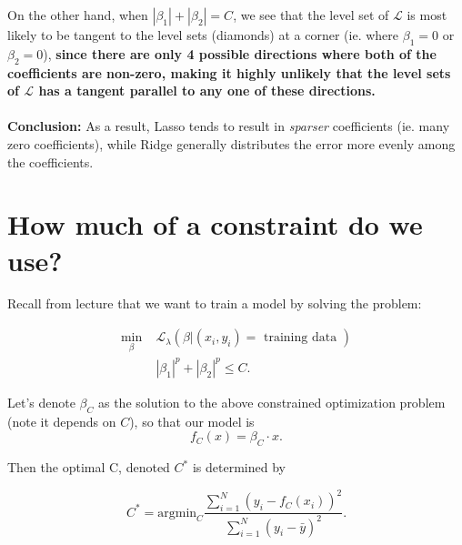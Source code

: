 \documentclass[paper=a4, fontsize=11pt]{scrartcl} %
\numberwithin{equation}{section} %
\numberwithin{figure}{section} %
\numberwithin{table}{section} %
\begin{document}
On the other hand, when $|\beta_1| + |\beta_2| = C$, we see that the level set of $\mathcal{L}$ is most likely to be tangent to the level sets (diamonds) at a corner  (ie. where $\beta_1=0$ or $\beta_2=0$),
\textbf{since there are only 4 possible directions where both of the coefficients are non-zero, making it highly unlikely that the level sets of $\mathcal{L}$ has a tangent parallel to any one of these directions. }\\\\


\textbf{Conclusion:} As a result, Lasso tends to result in \emph{sparser} coefficients (ie. many zero coefficients), while Ridge generally distributes the error more evenly among the coefficients. 

\section{How much of a constraint do we use?}

Recall from lecture that we want to train a model by solving the problem:

\begin{align}
\min_{\beta}\; &\mathcal{L}_{\lambda} (\beta | (x_i,y_i) = \textrm{ training data }) \\
&|\beta_1|^p + |\beta_2|^p \leq C.
\end{align}

Let's denote $\beta_C$ as the solution to the above constrained optimization problem (note it depends on $C$), so that our model is
\[ f_C(x) = \beta_{C} \cdot x.\]

 Then the optimal C, denoted $C^*$ is determined by

\begin{equation}
C^* = \textrm{argmin}_C \frac{\sum_{i=1}^N (y_i - f_C(x_i))^2}{\sum_{i=1}^N (y_i - \bar y)^2}.
\end{equation}
\end{document}
